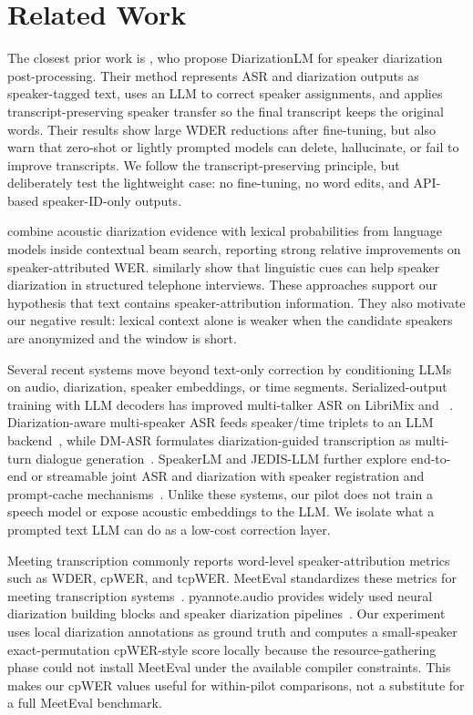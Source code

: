 \section{Related Work}
\label{sec:related}

 The closest prior work is \citet{wang2024diarizationlm}, who propose DiarizationLM for speaker diarization post-processing. Their method represents ASR and diarization outputs as speaker-tagged text, uses an LLM to correct speaker assignments, and applies transcript-preserving speaker transfer so the final transcript keeps the original words. Their results show large WDER reductions after fine-tuning, but also warn that zero-shot or lightly prompted models can delete, hallucinate, or fail to improve transcripts. We follow the transcript-preserving principle, but deliberately test the lightweight case: no fine-tuning, no word edits, and API-based speaker-ID-only outputs.

 \citet{park2023enhancing} combine acoustic diarization evidence with lexical probabilities from language models inside contextual beam search, reporting strong relative improvements on speaker-attributed WER. \citet{india2025language} similarly show that linguistic cues can help speaker diarization in structured telephone interviews. These approaches support our hypothesis that text contains speaker-attribution information. They also motivate our negative result: lexical context alone is weaker when the candidate speakers are anonymized and the window is short.

 Several recent systems move beyond text-only correction by conditioning LLMs on audio, diarization, speaker embeddings, or time segments. Serialized-output training with LLM decoders has improved multi-talker ASR on LibriMix and \amisdm~\cite{shi2024advancing}. Diarization-aware multi-speaker ASR feeds speaker/time triplets to an LLM backend~\cite{lin2025diarizationaware}, while DM-ASR formulates diarization-guided transcription as multi-turn dialogue generation~\cite{li2026dmasr}. SpeakerLM and JEDIS-LLM further explore end-to-end or streamable joint ASR and diarization with speaker registration and prompt-cache mechanisms~\cite{yin2025speakerlm,shi2025train}. Unlike these systems, our pilot does not train a speech model or expose acoustic embeddings to the LLM. We isolate what a prompted text LLM can do as a low-cost correction layer.

 Meeting transcription commonly reports word-level speaker-attribution metrics such as WDER, cpWER, and tcpWER. MeetEval standardizes these metrics for meeting transcription systems~\cite{vonneumann2023meeteval}. pyannote.audio provides widely used neural diarization building blocks and speaker diarization pipelines~\cite{bredin2020pyannote,bredin2023pyannote}. Our experiment uses local diarization annotations as ground truth and computes a small-speaker exact-permutation cpWER-style score locally because the resource-gathering phase could not install MeetEval under the available compiler constraints. This makes our cpWER values useful for within-pilot comparisons, not a substitute for a full MeetEval benchmark.

